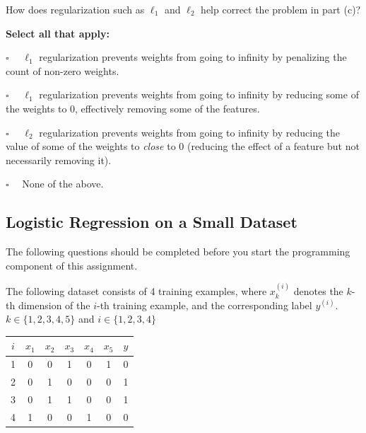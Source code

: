 \documentclass[11pt,addpoints,answers]{exam}
\newcommand{\emptysquare}{{\LARGE $\square$}\ \ }
\newcommand{\filledsquare}{{\LARGE $\boxtimes$}\ \ }
\begin{document}
\begin{questions}
    
    \begin{your_solution}[height=6cm]
    \end{your_solution}
    
    \question[2] How does regularization such as $\ell_1$ and $\ell_2$ help correct the problem in part (c)?
    
    \textbf{Select all that apply:}
    \begin{list}{}
        \item 
            \emptysquare
            $\ell_1$ regularization prevents weights from going to infinity by penalizing the count of non-zero weights.
        \item 
            \emptysquare
            $\ell_1$ regularization prevents weights from going to infinity by reducing some of the weights to 0, effectively removing some of the features. 
        \item 
            \emptysquare
            $\ell_2$ regularization prevents weights from going to infinity by reducing the value of some of the weights to \textit{close} to 0 (reducing the effect of a feature but not necessarily removing it). 
        \item 
            \emptysquare
            None of the above.
    \end{list}

    
\clearpage

\end{questions}

\subsection{Logistic Regression on a Small Dataset}
\label{sec:warm-up}

The following questions should be completed before you start the programming component of this assignment.

The following dataset consists of 4 training examples, where $x_k^{(i)}$ denotes the $k$-th dimension of the $i$-th training example, and the corresponding label $y^{(i)}$. $k \in \{1, 2, 3, 4, 5\}$ and $i \in \{1, 2, 3, 4\}$

\begin{center}
\begin{tabular}{|c|c|c|c|c|c|c|}
\hline
$i$ & $x_{1}$ & $x_{2}$ & $x_{3}$ & $x_{4}$ & $x_{5}$ & $y$ \\ \hline
1 & 0 & 0 & 1 & 0 & 1 & 0   \\ \hline
2 & 0 & 1 & 0 & 0 & 0 & 1     \\ \hline
3 & 0 & 1 & 1 & 0 & 0 & 1    \\ \hline
4 & 1 & 0 & 0 & 1 & 0 & 0   \\ \hline

\end{tabular}
\end{center}
\end{document}
